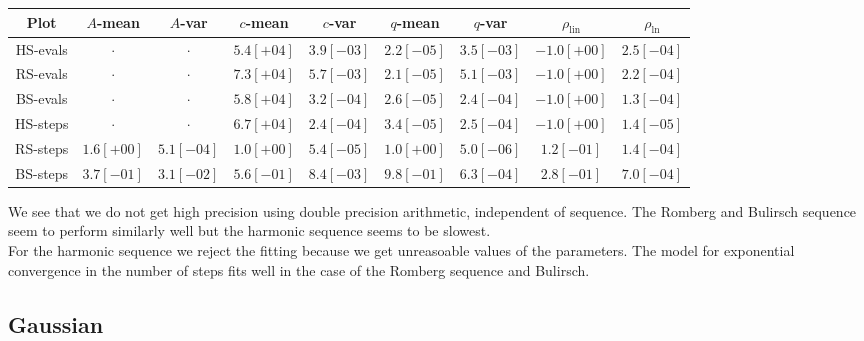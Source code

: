 \begin{table}[H]
    \centering
    \small
    \begin{tabular}{c||c|c|c|c|c|c|c|c}
Plot & \(A\)-mean & \(A\)-var & \(c\)-mean & \(c\)-var & \(q\)-mean & \(q\)-var & \(\rho_{\operatorname{lin}}\) & \(\rho_{\ln}\)\\\hline
\rowcolor{red}
HS-evals & \(\cdot\) & \(\cdot\) & \(5.4[+04]\) & \(3.9[-03]\) & \(2.2[-05]\) & \(3.5[-03]\) & \(-1.0[+00]\) & \(2.5[-04]\) \\
\rowcolor{red}
RS-evals & \(\cdot\) & \(\cdot\) & \(7.3[+04]\) & \(5.7[-03]\) & \(2.1[-05]\) & \(5.1[-03]\) & \(-1.0[+00]\) & \(2.2[-04]\) \\
\rowcolor{red}
BS-evals & \(\cdot\) & \(\cdot\) & \(5.8[+04]\) & \(3.2[-04]\) & \(2.6[-05]\) & \(2.4[-04]\) & \(-1.0[+00]\) & \(1.3[-04]\) \\
\rowcolor{red}
HS-steps & \(\cdot\) & \(\cdot\) & \(6.7[+04]\) & \(2.4[-04]\) & \(3.4[-05]\) & \(2.5[-04]\) & \(-1.0[+00]\) & \(1.4[-05]\) \\
\rowcolor{green}
RS-steps & \(1.6[+00]\) & \(5.1[-04]\) & \(1.0[+00]\) & \(5.4[-05]\) & \(1.0[+00]\) & \(5.0[-06]\) & \(1.2[-01]\) & \(1.4[-04]\) \\
\rowcolor{green}
BS-steps & \(3.7[-01]\) & \(3.1[-02]\) & \(5.6[-01]\) & \(8.4[-03]\) & \(9.8[-01]\) & \(6.3[-04]\) & \(2.8[-01]\) & \(7.0[-04]\) \\
    \end{tabular}
    \label{tab:my_label}
\end{table}

We see that we do not get high precision using double precision arithmetic, independent of sequence. The Romberg and Bulirsch sequence seem to perform similarly well but the harmonic sequence seems to be slowest.\\

For the harmonic sequence we reject the fitting because we get unreasoable values of the parameters. The model for exponential convergence in the number of steps fits well in the case of the Romberg sequence and Bulirsch.

\subsection{Gaussian}

